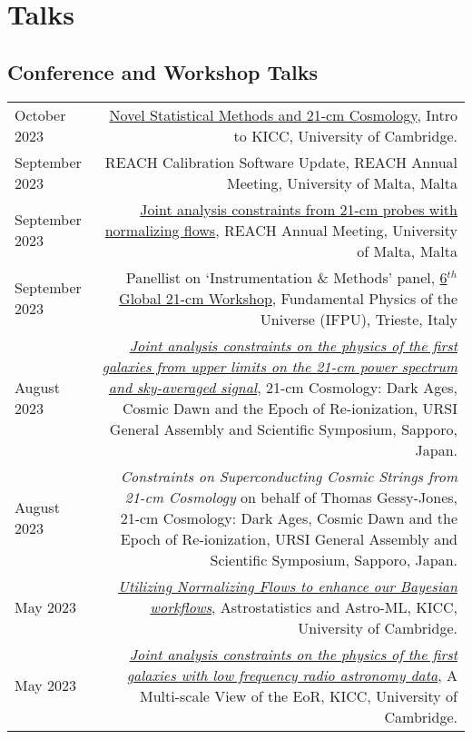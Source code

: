\documentclass{article}
\begin{document}
\section*{Talks}
\subsection*{Conference and Workshop Talks}
\begin{tabular}{L!{\vrule}R}
    October 2023 & \href{https://github.com/htjb/Talks/raw/master/Talks/KICC_Intro_23/kicc_intro_23.pdf}{Novel Statistical Methods and 21-cm Cosmology}, Intro to KICC, University of Cambridge. \\
    September 2023 & REACH Calibration Software Update, REACH Annual Meeting, University of Malta, Malta \\
    September 2023 & \href{https://github.com/htjb/Talks/tree/master/Talks/REACH_Malta/joint_analysis_margarine.pdf}{Joint analysis constraints from 21-cm probes with normalizing flows}, REACH Annual Meeting, University of Malta, Malta \\
    September 2023 & Panellist on `Instrumentation \& Methods' panel, \href{https://global21cmworkshop.org/2023-ifpu/}{6$^{th}$ Global 21-cm Workshop}, Fundamental Physics of the Universe (IFPU), Trieste, Italy \\
    August 2023 & \href{https://github.com/htjb/Talks/raw/master/Talks/URSI_2023/joint_analysis_margarine.pdf}{\textit{Joint analysis constraints on the physics of the first galaxies from upper limits on the 21-cm power spectrum and sky-averaged signal}}, 21-cm Cosmology: Dark Ages, Cosmic Dawn and the Epoch of Re-ionization, URSI General Assembly and Scientific Symposium, Sapporo, Japan. \\
    August 2023 & \textit{Constraints on Superconducting Cosmic Strings from 21-cm Cosmology} on behalf of Thomas Gessy-Jones, 21-cm Cosmology: Dark Ages, Cosmic Dawn and the Epoch of Re-ionization, URSI General Assembly and Scientific Symposium, Sapporo, Japan. \\
    May 2023 & \href{https://github.com/htjb/Talks/blob/master/Talks/KICC_EoR/Bevins_KICC_EoR.pdf}{\textit{Utilizing Normalizing Flows to enhance our Bayesian workflows}}, Astrostatistics and Astro-ML, KICC, University of Cambridge. \\
    May 2023 & \href{https://github.com/htjb/Talks/blob/master/Talks/KICC_EoR/Bevins_KICC_EoR.pdf}{\textit{Joint analysis constraints on the physics of the first galaxies with low frequency radio astronomy data}}, A Multi-scale View of the EoR, KICC, University of Cambridge. \\

\end{tabular}
\end{document}
